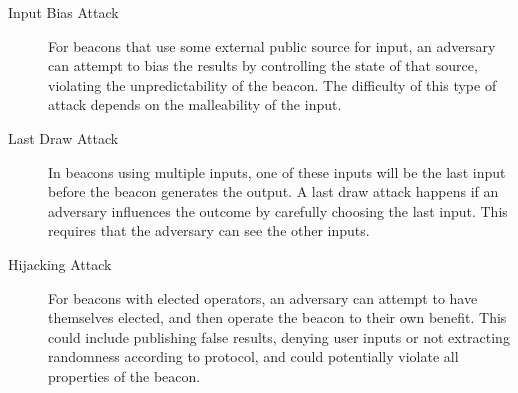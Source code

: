 \begin{description}
    \item[Input Bias Attack] For beacons that use some external public source for input, an adversary can attempt to bias the results by controlling the state of that source, violating the unpredictability of the beacon. The difficulty of this type of attack depends on the malleability of the input.
    \item[Last Draw Attack] In beacons using multiple inputs, one of these inputs will be the last input before the beacon generates the output. A last draw attack happens if an adversary influences the outcome by carefully choosing the last input. This requires that the adversary can see the other inputs.
    \item[Hijacking Attack] For beacons with elected operators, an adversary can attempt to have themselves elected, and then operate the beacon to their own benefit. This could include publishing false results, denying user inputs or not extracting randomness according to protocol, and could potentially violate all properties of the beacon. %

\end{description}

